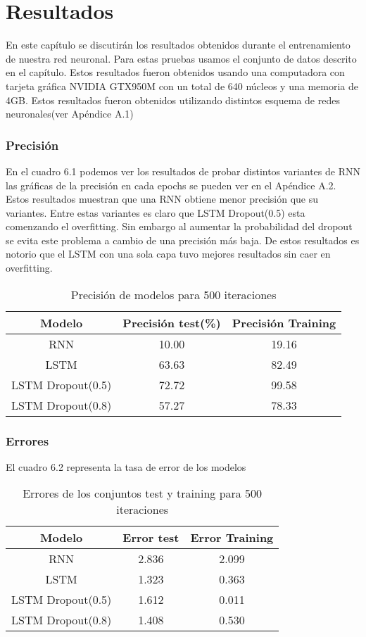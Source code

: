 \chapter{Resultados}
En este capítulo se discutirán los resultados obtenidos durante el entrenamiento de nuestra red neuronal.
Para estas pruebas usamos el conjunto de datos descrito en el capítulo. Estos resultados fueron
obtenidos usando una computadora con tarjeta gráfica NVIDIA GTX950M con
un total de 640 núcleos y una memoria de 4GB.
Estos resultados fueron obtenidos utilizando distintos esquema de redes neuronales(ver Apéndice A.1)
\subsection{Precisión}
En el cuadro 6.1 podemos ver los resultados de probar distintos variantes de RNN las gráficas de la precisión en cada epochs se pueden ver en el Apéndice A.2. Estos resultados muestran que una RNN obtiene menor precisión que su variantes. Entre estas variantes es claro que LSTM Dropout(0.5) esta comenzando el overfitting. Sin embargo al aumentar la probabilidad del dropout se evita este problema a cambio de una precisión más baja. De estos resultados es notorio que el LSTM con una sola capa tuvo mejores resultados sin caer en overfitting.
\begin{table}[H]
	\centering
	\begin{tabular}{|c|c|c|}
		\hline
		\rowcolor{Gray}  Modelo & Precisión test(\%) & Precisión Training \\ \hline
		RNN&        10.00  &             19.16         \\ \hline
		LSTM&        63.63  &          82.49           \\ \hline
		LSTM Dropout(0.5)&  72.72         &     99.58                \\ \hline
		LSTM Dropout(0.8)&	57.27		&	78.33		\\ \hline
	\end{tabular}
	\caption{Precisión de modelos para 500 iteraciones}
\end{table}
\subsection{Errores }
El cuadro 6.2 representa la tasa de error de los modelos 
\begin{table}[H]
	\centering
	\begin{tabular}{|c|c|c|}
		\hline
		\rowcolor{Gray}  Modelo & Error test  & Error Training\\ \hline
		RNN&        2.836         &2.099\\ \hline
		LSTM&       1.323         & 0.363  \\ \hline
		LSTM Dropout(0.5)&   1.612       &     0.011            \\ \hline
		LSTM Dropout(0.8)&	1.408		&0.530\\ \hline
	\end{tabular}
	\caption{Errores de los conjuntos test y training para 500 iteraciones}
\end{table}